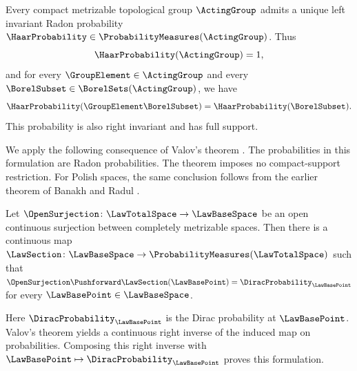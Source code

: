 \begin{theorem}\label{thm:haar}
Every compact metrizable topological group
$\ActingGroup$
admits a unique left invariant Radon probability
$\HaarProbability\in\ProbabilityMeasures(\ActingGroup)$.
Thus
\[
 \HaarProbability(\ActingGroup)=1,
\]
and for every
$\GroupElement\in\ActingGroup$
and every
$\BorelSubset\in\BorelSets(\ActingGroup)$,
we have
\[
 \HaarProbability(\GroupElement\BorelSubset)=\HaarProbability(\BorelSubset).
\]
This probability is also right invariant and has full support.
\end{theorem}

We apply the following consequence of Valov's theorem
\cite[arXiv v2, Theorem~1.1]{Valov2009}.
The probabilities in this formulation are Radon probabilities.
The theorem imposes no compact-support restriction.
For Polish spaces, the same conclusion follows from the earlier theorem
of Banakh and Radul \cite[Theorem~1.2, p.~20]{BanakhRadul1999}.

\begin{theorem}\label{thm:valov}
Let
$\OpenSurjection \colon \LawTotalSpace \to \LawBaseSpace $
be an open continuous surjection between completely metrizable spaces.
Then there is a continuous map
$\LawSection\colon \LawBaseSpace \to\ProbabilityMeasures(\LawTotalSpace )$
such that
$\OpenSurjection \Pushforward\LawSection(\LawBasePoint )=\DiracProbability _\LawBasePoint $
for every
$\LawBasePoint \in \LawBaseSpace $.
\end{theorem}

Here
$\DiracProbability _\LawBasePoint $
is the Dirac probability at
$\LawBasePoint $.
Valov's theorem yields a continuous right inverse of the induced
map on probabilities.
Composing this right inverse with
$\LawBasePoint \mapsto\DiracProbability _\LawBasePoint $
proves this formulation.

